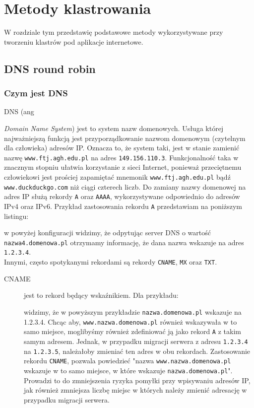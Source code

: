 \chapter{Metody klastrowania}
W rozdziale tym przedstawię podstawowe metody wykorzystywane przy tworzeniu klastrów pod aplikacje internetowe.
\section{DNS round robin}
\subsection{Czym jest DNS}
DNS (ang {\textit{Domain Name System}) jest to system nazw domenowych. Usługa której najważniejszą funkcją jest przyporządkowanie nazwom domenowym (czytelnym dla człowieka) adresów IP.
Oznacza to, że system taki, jest w stanie zamienić nazwę \texttt{www.ftj.agh.edu.pl} na adres \texttt{149.156.110.3}.
Funkcjonalność taka w znacznym stopniu ułatwia korzystanie z sieci Internet, ponieważ przeciętnemu człowiekowi jest prościej zapamiętać mnemonik \texttt{www.ftj.agh.edu.pl} bądź \texttt{www.duckduckgo.com} niż ciągi czterech liczb.
Do zamiany nazwy domenowej na adres IP służą rekordy \texttt{A} oraz \texttt{AAAA}, wykorzystywane odpowiednio do adresów IPv4 oraz IPv6.
Przykład zastosowania rekordu \texttt{A} przedstawiam na poniższym listingu:

w powyżej konfiguracji widzimy, że odpytując server DNS o wartość \texttt{nazwa4.domenowa.pl} otrzymamy informację, że dana nazwa wskazuje na adres \texttt{1.2.3.4}.\\
Innymi, często spotykanymi rekordami są rekordy \texttt{CNAME}, \texttt{MX} oraz \texttt{TXT}.
\begin{description}
\item[CNAME] jest to rekord będący wskaźnikiem. Dla przykładu:

widzimy, że w powyższym przykładzie \texttt{nazwa.domenowa.pl} wskazuje na 1.2.3.4.
Chcąc aby, \texttt{www.nazwa.domenowa.pl} również wskazywała w to samo miejsce, moglibyśmy również zdefiniować ją jako rekord \texttt{A} z takim samym adresem.
Jednak, w przypadku migracji serwera z adresu \texttt{1.2.3.4} na \texttt{1.2.3.5}, należałoby zmieniać ten adres w obu rekordach.
Zastosowanie rekordu \texttt{CNAME}, pozwala powiedzieć "nazwa \texttt{www.nazwa.domenowa.pl} wskazuje w to samo miejsce, w które wskazuje \texttt{nazwa.domenowa.pl}".
Prowadzi to do zmniejszenia ryzyka pomyłki przy wpisywaniu adresów IP, jak również zmniejsza liczbę miejsc w których należy zmienić adresację w przypadku migracji serwera.

\end{description}}
